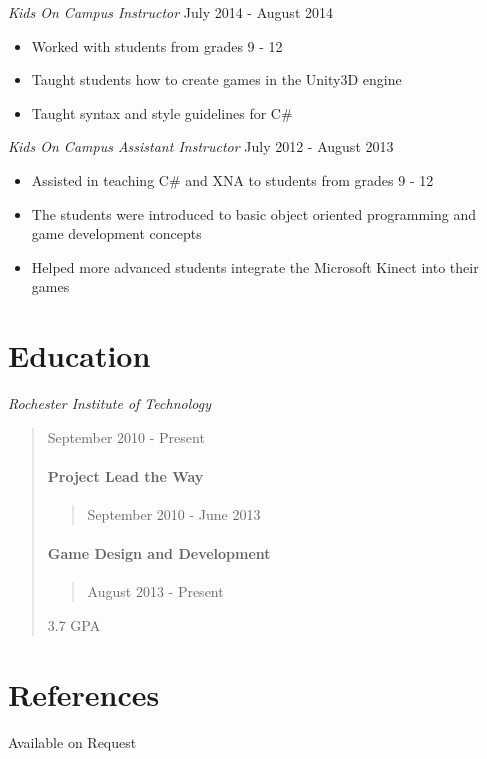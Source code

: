 \documentclass[line,margin]{res}
\begin{document}
\begin{resume}
{\sl Kids On Campus Instructor} \hfill July 2014 - August 2014
\begin{itemize}
\itemsep1pt\parskip0pt
\item
  Worked with students from grades 9 - 12
\item
  Taught students how to create games in the Unity3D engine
\item
  Taught syntax and style guidelines for C\#
\end{itemize}

{\sl Kids On Campus Assistant Instructor} \hfill July 2012 - August 2013
\begin{itemize}
\itemsep1pt\parskip0pt
\item
  Assisted in teaching C\# and XNA to students from grades 9 - 12
\item
  The students were introduced to basic object oriented programming and
  game development concepts
\item
  Helped more advanced students integrate the Microsoft Kinect into
  their games
\end{itemize}


\section{Education}
\sl{Rochester Institute of
Technology}
\begin{quote}
September 2010 - Present
\paragraph{Project Lead the Way}
\begin{quote}
September 2010 - June 2013
\end{quote}
\paragraph{Game Design and
Development}
\begin{quote}
August 2013 - Present
\end{quote}
3.7 GPA
\end{quote}
\section{References}
Available on Request
\end{resume}
\end{document}
